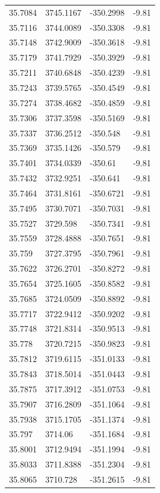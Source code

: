 \begin{table}[H]
\begin{tabular}{llll}
35.7084 & 3745.1167 & -350.2998 & -9.81 \\
35.7116 & 3744.0089 & -350.3308 & -9.81 \\
35.7148 & 3742.9009 & -350.3618 & -9.81 \\
35.7179 & 3741.7929 & -350.3929 & -9.81 \\
35.7211 & 3740.6848 & -350.4239 & -9.81 \\
35.7243 & 3739.5765 & -350.4549 & -9.81 \\
35.7274 & 3738.4682 & -350.4859 & -9.81 \\
35.7306 & 3737.3598 & -350.5169 & -9.81 \\
35.7337 & 3736.2512 & -350.548 & -9.81 \\
35.7369 & 3735.1426 & -350.579 & -9.81 \\
35.7401 & 3734.0339 & -350.61 & -9.81 \\
35.7432 & 3732.9251 & -350.641 & -9.81 \\
35.7464 & 3731.8161 & -350.6721 & -9.81 \\
35.7495 & 3730.7071 & -350.7031 & -9.81 \\
35.7527 & 3729.598 & -350.7341 & -9.81 \\
35.7559 & 3728.4888 & -350.7651 & -9.81 \\
35.759 & 3727.3795 & -350.7961 & -9.81 \\
35.7622 & 3726.2701 & -350.8272 & -9.81 \\
35.7654 & 3725.1605 & -350.8582 & -9.81 \\
35.7685 & 3724.0509 & -350.8892 & -9.81 \\
35.7717 & 3722.9412 & -350.9202 & -9.81 \\
35.7748 & 3721.8314 & -350.9513 & -9.81 \\
35.778 & 3720.7215 & -350.9823 & -9.81 \\
35.7812 & 3719.6115 & -351.0133 & -9.81 \\
35.7843 & 3718.5014 & -351.0443 & -9.81 \\
35.7875 & 3717.3912 & -351.0753 & -9.81 \\
35.7907 & 3716.2809 & -351.1064 & -9.81 \\
35.7938 & 3715.1705 & -351.1374 & -9.81 \\
35.797 & 3714.06 & -351.1684 & -9.81 \\
35.8001 & 3712.9494 & -351.1994 & -9.81 \\
35.8033 & 3711.8388 & -351.2304 & -9.81 \\
35.8065 & 3710.728 & -351.2615 & -9.81 \\

\end{tabular}
\end{table}
